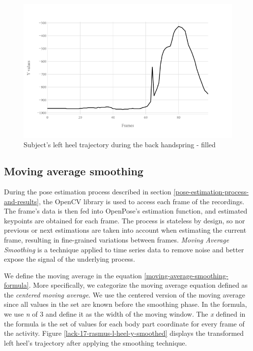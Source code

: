 \begin{figure}[htb]
  \centering
    \includegraphics[width=\textwidth,keepaspectratio]
    {images/data-preprocessing/flack-17-rasmus-l-heel-y-filled}
    \caption{Subject's left heel trajectory during the back handspring - filled}
    \label{lack-17-rasmus-l-heel-y-filled}
\end{figure}

\subsection{Moving average smoothing}

During the pose estimation process described in section \ref{pose-estimation-process-and-results}, the OpenCV library is used to access each frame of the recordings. The frame's data is then fed into OpenPose's estimation function, and estimated keypoints are obtained for each frame. The process is stateless by design, so nor previous or next estimations are taken into account when estimating the current frame, resulting in fine-grained variations between frames. \textit{Moving Average Smoothing} is a technique applied to time series data to remove noise and better expose the signal of the underlying process.

We define the moving average in the equation \ref{moving-average-smoothing-formula}. More specifically, we categorize the moving average equation defined as the \textit{centered moving average}. We use the centered version of the moving average since all values in the set are known before the smoothing phase. In the formula, we use \textit{n} of 3 and define it as the width of the moving window. The \textit{x} defined in the formula is the set of values for each body part coordinate for every frame of the activity. Figure \ref{lack-17-rasmus-l-heel-y-smoothed} displays the transformed left heel's trajectory after applying the smoothing technique.


